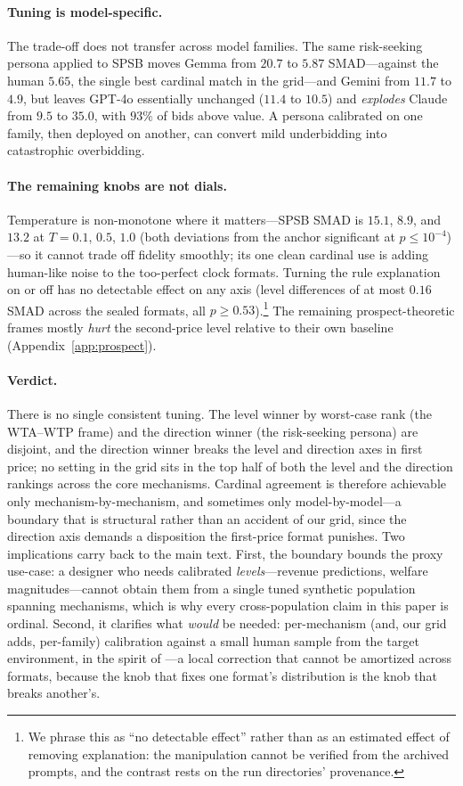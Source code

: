 \paragraph{Tuning is model-specific.}
The trade-off does not transfer across model families. The same risk-seeking persona applied to SPSB moves Gemma from $20.7$ to $5.87$ SMAD---against the human $5.65$, the single best cardinal match in the grid---and Gemini from $11.7$ to $4.9$, but leaves GPT-4o essentially unchanged ($11.4$ to $10.5$) and \emph{explodes} Claude from $9.5$ to $35.0$, with $93\%$ of bids above value. A persona calibrated on one family, then deployed on another, can convert mild underbidding into catastrophic overbidding.

\paragraph{The remaining knobs are not dials.}
Temperature is non-monotone where it matters---SPSB SMAD is $15.1$, $8.9$, and $13.2$ at $T = 0.1$, $0.5$, $1.0$ (both deviations from the anchor significant at $p \le 10^{-4}$)---so it cannot trade off fidelity smoothly; its one clean cardinal use is adding human-like noise to the too-perfect clock formats. Turning the rule explanation on or off has no detectable effect on any axis (level differences of at most $0.16$ SMAD across the sealed formats, all $p \ge 0.53$).\footnote{We phrase this as ``no detectable effect'' rather than as an estimated effect of removing explanation: the manipulation cannot be verified from the archived prompts, and the contrast rests on the run directories' provenance.} The remaining prospect-theoretic frames mostly \emph{hurt} the second-price level relative to their own baseline (Appendix~\ref{app:prospect}).

\paragraph{Verdict.}
There is no single consistent tuning. The level winner by worst-case rank (the WTA--WTP frame) and the direction winner (the risk-seeking persona) are disjoint, and the direction winner breaks the level and direction axes in first price; no setting in the grid sits in the top half of both the level and the direction rankings across the core mechanisms. Cardinal agreement is therefore achievable only mechanism-by-mechanism, and sometimes only model-by-model---a boundary that is structural rather than an accident of our grid, since the direction axis demands a disposition the first-price format punishes. Two implications carry back to the main text. First, the boundary bounds the proxy use-case: a designer who needs calibrated \emph{levels}---revenue predictions, welfare magnitudes---cannot obtain them from a single tuned synthetic population spanning mechanisms, which is why every cross-population claim in this paper is ordinal. Second, it clarifies what \emph{would} be needed: per-mechanism (and, our grid adds, per-family) calibration against a small human sample from the target environment, in the spirit of \citet{corrigan2025usefulness}---a local correction that cannot be amortized across formats, because the knob that fixes one format's distribution is the knob that breaks another's.
